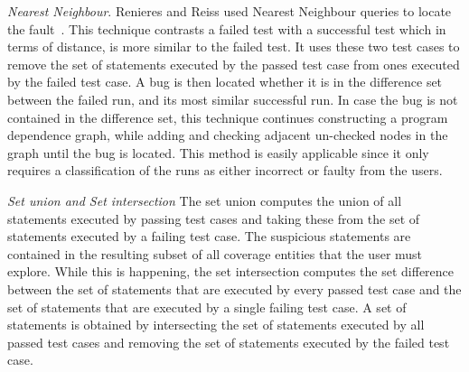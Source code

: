 \documentclass[a4paper, 12pt]{book}
\begin{document}

\emph{Nearest Neighbour}. Renieres and Reiss used Nearest Neighbour queries to locate the fault~\cite{renieres2003fault}. This technique contrasts a failed test with a successful test which in terms of distance, is more similar to the failed test. It uses these two test cases to remove the set of statements executed by the passed test case from ones executed by the failed test case. A bug is then located whether it is in the difference set between the failed run, and its most similar successful run. In case the bug is not contained in the difference set, this technique continues constructing a program dependence graph, while adding and checking adjacent un-checked nodes in the graph until the bug is located. This method is easily applicable since it only requires a classification of the runs as either incorrect or faulty from the users.

\emph{Set union and Set intersection}
The set union computes the union of all statements executed by passing test cases and taking these from the set of statements executed by a failing test case. The suspicious statements are contained in the resulting subset of all coverage entities that the user must explore. While this is happening, the set intersection computes
the set difference between the set of statements that are executed by every passed test case and the set of statements that are executed by a single failing test case. A set of statements is obtained by intersecting the set of statements executed by all passed test cases and removing the set of statements executed by the failed test case.  


\end{document}
